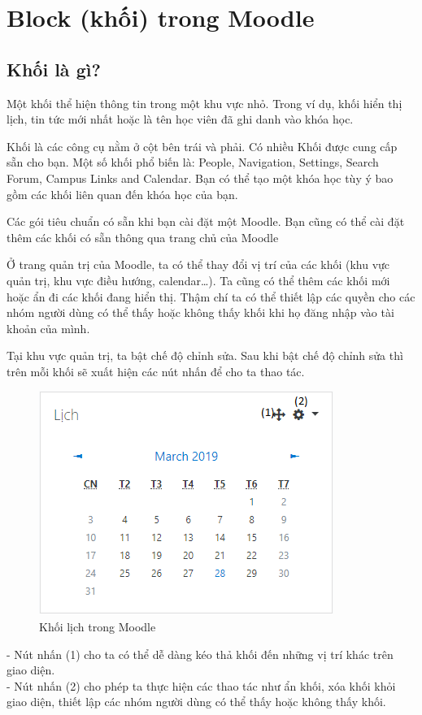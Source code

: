 \section{Block (khối) trong Moodle}
\subsection{Khối là gì?}
Một khối thể hiện thông tin trong một khu vực nhỏ. Trong ví dụ, khối hiển thị lịch, tin tức mới nhất hoặc là tên học viên đã ghi danh vào khóa học.

Khối là các công cụ nằm ở cột bên trái và phải. Có nhiều Khối được cung cấp sẵn cho bạn. Một số khối phổ biến là: People, Navigation, Settings, Search Forum, Campus Links and Calendar. Bạn có thể tạo một khóa học tùy ý bao gồm các khối liên quan đến khóa học của bạn.

Các gói tiêu chuẩn có sẵn khi bạn cài đặt một Moodle. Bạn cũng có thể cài đặt thêm các khối có sẵn thông qua trang chủ của Moodle

Ở trang quản trị của Moodle, ta có thể thay đổi vị trí của các khối (khu vực quản trị, khu vực điều hướng, calendar…). Ta cũng có thể thêm các khối mới hoặc ẩn đi các khối đang hiển thị. Thậm chí ta có thể thiết lập các quyền cho các nhóm người dùng có thể thấy hoặc không thấy khối khi họ đăng nhập vào tài khoản của mình.

Tại khu vực quản trị, ta bật chế độ chỉnh sửa. Sau khi bật chế độ chỉnh sửa thì trên mỗi khối sẽ xuất hiện các nút nhấn để cho ta thao tác.
\begin{center}
	\begin{figure}[htp]
		\begin{center}
			\includegraphics[scale=1]{img/lich}
		\end{center}
		\caption{Khối lịch trong Moodle}
		\label{refhinh2}
	\end{figure}
\end{center}
- Nút nhấn (1) cho ta có thể dễ dàng kéo thả khối đến những vị trí khác trên giao diện.\\
- Nút nhấn (2) cho phép ta thực hiện các thao tác như ẩn khối, xóa khối khỏi giao diện, thiết lập các nhóm người dùng có thể thấy hoặc không thấy khối.

